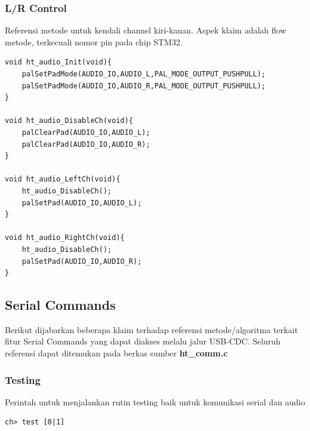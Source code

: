 \documentclass[12pt,]{article}
\begin{document}
	\subsubsection{L/R Control}
	
	Referensi metode untuk kendali channel kiri-kanan.
	Aspek klaim adalah flow metode, terkecuali nomor pin pada chip STM32.
	
	\begin{verbatim}
void ht_audio_Init(void){
	palSetPadMode(AUDIO_IO,AUDIO_L,PAL_MODE_OUTPUT_PUSHPULL);
	palSetPadMode(AUDIO_IO,AUDIO_R,PAL_MODE_OUTPUT_PUSHPULL);
}
	
void ht_audio_DisableCh(void){
	palClearPad(AUDIO_IO,AUDIO_L);
	palClearPad(AUDIO_IO,AUDIO_R);
}

void ht_audio_LeftCh(void){
	ht_audio_DisableCh();
	palSetPad(AUDIO_IO,AUDIO_L);
}

void ht_audio_RightCh(void){
	ht_audio_DisableCh();
	palSetPad(AUDIO_IO,AUDIO_R);
}
	\end{verbatim}
	
	\newpage
	\subsection{Serial Commands}
	
	Berikut dijabarkan beberapa klaim terhadap referensi metode/algoritma terkait fitur Serial Commands yang dapat diakses melalu jalur USB-CDC.
	Seluruh referensi dapat ditemukan pada berkas sumber \textbf{ht\_comm.c}
	
	\subsubsection{Testing}
	Perintah untuk menjalankan rutin testing baik untuk komunikasi serial dan audio
	\begin{verbatim}
ch> test [0|1]
	\end{verbatim}
\end{document}
